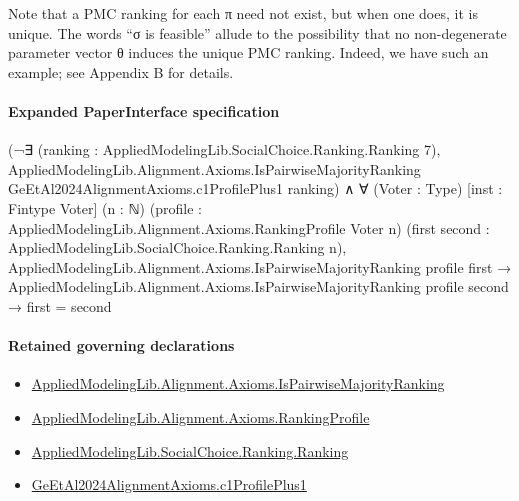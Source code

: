 \documentclass[10pt]{article}
\begin{document}
\begin{ReviewVerbatim}
Note that a PMC ranking for each π need not exist, but when one does, it is unique. The words “σ
is feasible” allude to the possibility that no non-degenerate parameter vector θ induces the unique
PMC ranking. Indeed, we have such an example; see Appendix B for details.
\end{ReviewVerbatim}



\paragraph{Expanded PaperInterface specification}
\begin{ReviewVerbatim}
(¬∃ (ranking : AppliedModelingLib.SocialChoice.Ranking.Ranking 7),
      AppliedModelingLib.Alignment.Axioms.IsPairwiseMajorityRanking GeEtAl2024AlignmentAxioms.c1ProfilePlus1 ranking) ∧
  ∀ (Voter : Type) [inst : Fintype Voter] (n : ℕ) (profile : AppliedModelingLib.Alignment.Axioms.RankingProfile Voter n)
    (first second : AppliedModelingLib.SocialChoice.Ranking.Ranking n),
    AppliedModelingLib.Alignment.Axioms.IsPairwiseMajorityRanking profile first →
      AppliedModelingLib.Alignment.Axioms.IsPairwiseMajorityRanking profile second → first = second
\end{ReviewVerbatim}

\paragraph{Retained governing declarations}
\begin{itemize}\raggedright
\item \hyperlink{governing-declaration-1d952514f8013a9b}{Applied\allowbreak{}Modeling\allowbreak{}Lib.\allowbreak{}Alignment.\allowbreak{}Axioms.\allowbreak{}Is\allowbreak{}Pairwise\allowbreak{}Majority\allowbreak{}Ranking}
\item \hyperlink{library-prerequisite-9bded048a60dfe0a}{Applied\allowbreak{}Modeling\allowbreak{}Lib.\allowbreak{}Alignment.\allowbreak{}Axioms.\allowbreak{}Ranking\allowbreak{}Profile}
\item \hyperlink{library-prerequisite-5cde54446d1ae021}{Applied\allowbreak{}Modeling\allowbreak{}Lib.\allowbreak{}Social\allowbreak{}Choice.\allowbreak{}Ranking.\allowbreak{}Ranking}
\item \hyperlink{governing-declaration-67441cb057d87c3a}{Ge\allowbreak{}Et\allowbreak{}Al2024\allowbreak{}Alignment\allowbreak{}Axioms.\allowbreak{}c1\allowbreak{}Profile\allowbreak{}Plus1}
\end{itemize}
\end{document}
